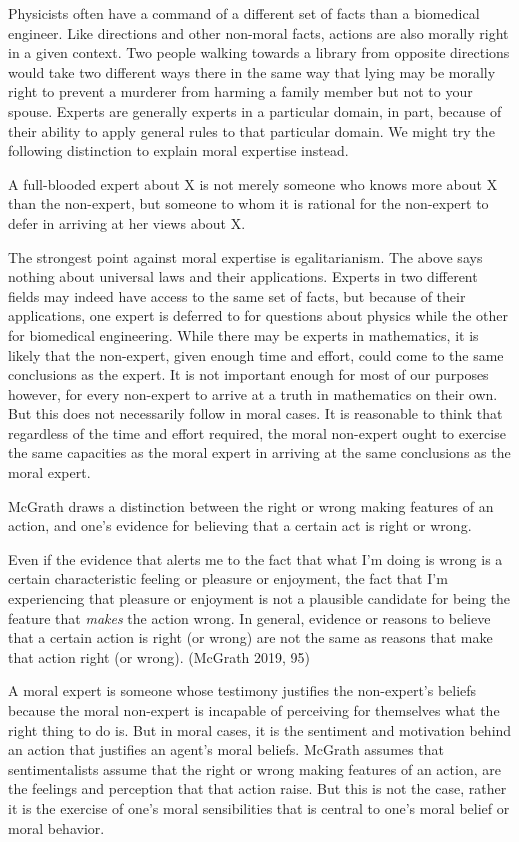 \documentclass[
  letterpaper,
  DIV=11,
  numbers=noendperiod]{scrartcl}
\theoremstyle{remark}
\begin{document}
Physicists often have a command of a different set of facts than a
biomedical engineer. Like directions and other non-moral facts, actions
are also morally right in a given context. Two people walking towards a
library from opposite directions would take two different ways there in
the same way that lying may be morally right to prevent a murderer from
harming a family member but not to your spouse. Experts are generally
experts in a particular domain, in part, because of their ability to
apply general rules to that particular domain. We might try the
following distinction to explain moral expertise instead.

A full-blooded expert about X is not merely someone who knows more about
X than the non-expert, but someone to whom it is rational for the
non-expert to defer in arriving at her views about X.

The strongest point against moral expertise is egalitarianism. The above
says nothing about universal laws and their applications. Experts in two
different fields may indeed have access to the same set of facts, but
because of their applications, one expert is deferred to for questions
about physics while the other for biomedical engineering. While there
may be experts in mathematics, it is likely that the non-expert, given
enough time and effort, could come to the same conclusions as the
expert. It is not important enough for most of our purposes however, for
every non-expert to arrive at a truth in mathematics on their own. But
this does not necessarily follow in moral cases. It is reasonable to
think that regardless of the time and effort required, the moral
non-expert ought to exercise the same capacities as the moral expert in
arriving at the same conclusions as the moral expert.

McGrath draws a distinction between the right or wrong making features
of an action, and one's evidence for believing that a certain act is
right or wrong.

Even if the evidence that alerts me to the fact that what I'm doing is
wrong is a certain characteristic feeling or pleasure or enjoyment, the
fact that I'm experiencing that pleasure or enjoyment is not a plausible
candidate for being the feature that \emph{makes} the action wrong. In
general, evidence or reasons to believe that a certain action is right
(or wrong) are not the same as reasons that make that action right (or
wrong). (McGrath 2019, 95)

A moral expert is someone whose testimony justifies the non-expert's
beliefs because the moral non-expert is incapable of perceiving for
themselves what the right thing to do is. But in moral cases, it is the
sentiment and motivation behind an action that justifies an agent's
moral beliefs. McGrath assumes that sentimentalists assume that the
right or wrong making features of an action, are the feelings and
perception that that action raise. But this is not the case, rather it
is the exercise of one's moral sensibilities that is central to one's
moral belief or moral behavior.
\end{document}
